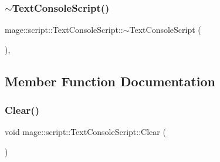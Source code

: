 \hypertarget{classmage_1_1script_1_1_text_console_script_af0959c8a4f21bb4f9b5553dffc5710b9}{}\label{classmage_1_1script_1_1_text_console_script_af0959c8a4f21bb4f9b5553dffc5710b9} 
\subsubsection{\texorpdfstring{$\sim$\+Text\+Console\+Script()}{~TextConsoleScript()}}
{\footnotesize\ttfamily mage\+::script\+::\+Text\+Console\+Script\+::$\sim$\+Text\+Console\+Script (\begin{DoxyParamCaption}{ }\end{DoxyParamCaption})\hspace{0.3cm}{\ttfamily [virtual]}, {\ttfamily [default]}}



\subsection{Member Function Documentation}
\hypertarget{classmage_1_1script_1_1_text_console_script_a274764deea9f02ec77515680456548d6}{}\label{classmage_1_1script_1_1_text_console_script_a274764deea9f02ec77515680456548d6} 
\subsubsection{\texorpdfstring{Clear()}{Clear()}}
{\footnotesize\ttfamily void mage\+::script\+::\+Text\+Console\+Script\+::\+Clear (\begin{DoxyParamCaption}{ }\end{DoxyParamCaption})}

\hypertarget{classmage_1_1script_1_1_text_console_script_a6de4d411f60dd62c507c6380ac987030}{}\label{classmage_1_1script_1_1_text_console_script_a6de4d411f60dd62c507c6380ac987030} 
